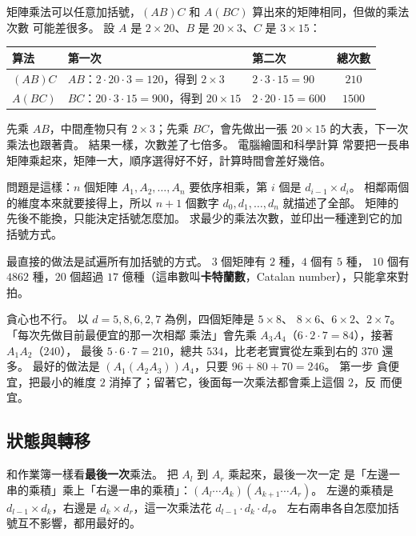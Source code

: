 矩陣乘法可以任意加括號，$(AB)C$ 和 $A(BC)$ 算出來的矩陣相同，但做的乘法次數
可能差很多。 設 $A$ 是 $2 \times 20$、$B$ 是 $20 \times 3$、$C$ 是
$3 \times 15$：

\begin{center}
\begin{tabular}{lllc}
\toprule
算法 & 第一次 & 第二次 & 總次數 \\
\midrule
$(AB)C$ & $AB$：$2 \cdot 20 \cdot 3 = 120$，得到 $2 \times 3$ & $2 \cdot 3 \cdot 15 = 90$ & $210$ \\
$A(BC)$ & $BC$：$20 \cdot 3 \cdot 15 = 900$，得到 $20 \times 15$ & $2 \cdot 20 \cdot 15 = 600$ & $1500$ \\
\bottomrule
\end{tabular}
\end{center}

先乘 $AB$，中間產物只有 $2 \times 3$；先乘 $BC$，會先做出一張 $20 \times 15$
的大表，下一次乘法也跟著貴。 結果一樣，次數差了七倍多。 電腦繪圖和科學計算
常要把一長串矩陣乘起來，矩陣一大，順序選得好不好，計算時間會差好幾倍。

問題是這樣：$n$ 個矩陣 $A_1, A_2, \ldots, A_n$ 要依序相乘，第 $i$ 個是
$d_{i-1} \times d_i$。 相鄰兩個的維度本來就要接得上，所以 $n + 1$ 個數字
$d_0, d_1, \ldots, d_n$ 就描述了全部。 矩陣的先後不能換，只能決定括號怎麼加。
求最少的乘法次數，並印出一種達到它的加括號方式。

最直接的做法是試遍所有加括號的方式。 $3$ 個矩陣有 $2$ 種，$4$ 個有 $5$ 種，
$10$ 個有 $4862$ 種，$20$ 個超過 $17$ 億種（這串數叫\textbf{卡特蘭數}，Catalan
number），只能拿來對拍。

貪心也不行。 以 $d = 5, 8, 6, 2, 7$ 為例，四個矩陣是 $5 \times 8$、
$8 \times 6$、$6 \times 2$、$2 \times 7$。 「每次先做目前最便宜的那一次相鄰
乘法」會先乘 $A_3 A_4$（$6 \cdot 2 \cdot 7 = 84$），接著 $A_1 A_2$（$240$），
最後 $5 \cdot 6 \cdot 7 = 210$，總共 $534$，比老老實實從左乘到右的 $370$ 還
多。 最好的做法是 $(A_1 (A_2 A_3)) A_4$，只要 $96 + 80 + 70 = 246$。 第一步
貪便宜，把最小的維度 $2$ 消掉了；留著它，後面每一次乘法都會乘上這個 $2$，反
而便宜。

\subsection{狀態與轉移}

和作業簿一樣看\textbf{最後一次}乘法。 把 $A_l$ 到 $A_r$ 乘起來，最後一次一定
是「左邊一串的乘積」乘上「右邊一串的乘積」：$(A_l \cdots A_k)(A_{k+1} \cdots A_r)$。
左邊的乘積是 $d_{l-1} \times d_k$，右邊是 $d_k \times d_r$，這一次乘法花
$d_{l-1} \cdot d_k \cdot d_r$。 左右兩串各自怎麼加括號互不影響，都用最好的。

